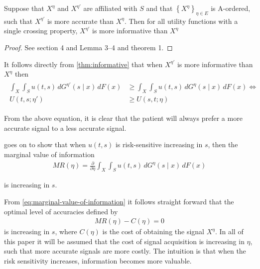 \documentclass[10pt,a4paper]{article} 					%
\begin{document}
\begin{thm}\label{thm:informative}
\parencite{Persico2000}
Suppose that \(X^{\eta}\) and \(X^{\eta'}\) are affiliated with \(S\) and that \(\left \{X^{\eta}\right \} _{\eta\in E}\) is A-ordered, such that \(X^{\eta'}\) is more accurate than \(X^{\eta}\). Then for all utility functions with a single crossing property, \(X^{\eta'}\) is more informative than \(X^{\eta}\)
\end{thm}
\begin{proof}
See \citet{Lehmann1988} section 4 and \citet{Karlin1956} Lemma 3--4 and theorem 1.
\end{proof}

It follows directly from \cref{thm:informative} that when \(X^{\eta'}\) is more informative than \(X^{\eta}\)  then
\begin{align}
	\label{eq:utility-increasing-information}
	\begin{split}
	\int_{X}\int_{S}u(t,s)\, dG^{\eta'}(s\mid x)\, dF(x)&\geq \int_{X}\int_{S}u(t,s)\, dG^{\eta}(s\mid x)\, dF(x) \Leftrightarrow \\
	U(t,s;\eta')&\geq U(s,t;\eta)
\end{split}
\end{align}

From the above equation, it is clear that the patient will always prefer a more accurate signal to a less accurate signal.

\textcite{Persico2000} goes on to show that when \(u(t,s)\) is risk-sensitive increasing in \(s\), then the marginal value of information
\begin{align}
		MR(\eta)=\frac{\partial}{\partial \eta} \int_{X}\int_{S}u(t,s)\, dG^{\eta}(s\mid x)\, dF(x) \label{eq:marginal-value-of-information}
\end{align}


is increasing in \(s\).

From \cref{eq:marginal-value-of-information} it follows straight forward that the optimal level of accuracies defined by
\begin{align}
	MR(\eta)-C(\eta)=0
\end{align}
 is increasing in \(s\), where \(C(\eta)\) is the cost of obtaining the signal \(X^\eta\). In all of this paper it will be assumed that the cost of signal acquisition is increasing in \(\eta\), such that more accurate signals are more costly. The intuition is that when the risk sensitivity increases, information becomes more valuable.
\end{document}
